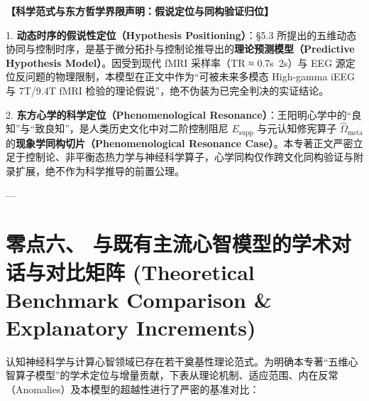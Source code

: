 \documentclass[11pt,a4paper,oneside]{ctexart}
\begin{document}
\begin{cautionbox}
\textbf{【科学范式与东方哲学界限声明：假说定位与同构验证归位】}

1. \textbf{动态时序的假说性定位（Hypothesis Positioning）}：§5.3 所提出的五维动态协同与控制时序，是基于微分拓扑与控制论推导出的\textbf{理论预测模型（Predictive Hypothesis Model）}。因受到现代 fMRI 采样率（TR ≈ 0.7s~2s）与 EEG 源定位反问题的物理限制，本模型在正文中作为“可被未来多模态 High-gamma iEEG 与 7T/9.4T fMRI 检验的理论假说”，绝不伪装为已完全判决的实证结论。

2. \textbf{东方心学的科学定位（Phenomenological Resonance）}：王阳明心学中的“良知”与“致良知”，是人类历史文化中对二阶控制阻尼 $E_{\text{supp}}$ 与元认知修宪算子 $\hat{\Omega}_{\text{meta}}$ 的\textbf{现象学同构切片（Phenomenological Resonance Case）}。本专著正文严密立足于控制论、非平衡态热力学与神经科学算子，心学同构仅作跨文化同构验证与附录扩展，绝不作为科学推导的前置公理。
\end{cautionbox}

---


\section{零点六、 与既有主流心智模型的学术对话与对比矩阵 (Theoretical Benchmark Comparison \& Explanatory Increments)}

认知神经科学与计算心智领域已存在若干奠基性理论范式。为明确本专著“五维心智算子模型”的学术定位与增量贡献，下表从理论机制、适应范围、内在反常（Anomalies）及本模型的超越性进行了严密的基准对比：
\end{document}
